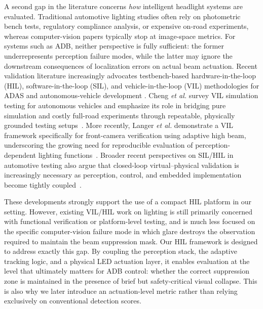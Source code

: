 \documentclass[pdflatex,sn-mathphys-num]{sn-jnl}%
\theoremstyle{thmstyleone}%
\theoremstyle{thmstyletwo}%
\theoremstyle{thmstylethree}%
\begin{document}

A second gap in the literature concerns \emph{how} intelligent headlight systems are evaluated. Traditional automotive lighting studies often rely
on photometric bench tests, regulatory compliance analysis, or expensive on-road experiments, whereas computer-vision papers typically stop at image-space metrics. For systems such as ADB, neither perspective is fully sufficient: the former underrepresents perception failure modes, while the latter may ignore the downstream consequences of localization errors on actual beam actuation.
Recent validation literature increasingly advocates testbench-based hardware-in-the-loop (HIL), software-in-the-loop (SIL), and vehicle-in-the-loop (VIL) methodologies for ADAS and autonomous-vehicle
development \cite{cheng2024survey, langer2026vehicle,balan2025perspective}. Cheng \emph{et al.} survey VIL simulation testing for autonomous vehicles and emphasize its role in bridging pure simulation and costly full-road experiments through repeatable, physically grounded
testing setups~\cite{cheng2024survey}. More recently, Langer \emph{et al.} demonstrate a VIL framework specifically for front-camera verification using adaptive high beam, underscoring the growing need for
reproducible evaluation of perception-dependent lighting functions~\cite{langer2026vehicle}. Broader recent perspectives on SIL/HIL in automotive testing also argue that closed-loop virtual--physical validation is increasingly necessary as perception, control, and embedded implementation become tightly coupled~\cite{balan2025perspective}.

These developments strongly support the use of a compact HIL platform in our setting. However, existing VIL/HIL work on lighting is still primarily concerned with functional verification or platform-level testing, and is much less focused on the specific computer-vision failure mode in which glare destroys the observation required to maintain the beam
suppression mask. Our HIL framework is designed to address exactly this gap. By coupling the perception stack, the adaptive tracking logic, and a physical LED actuation layer, it enables evaluation at the level that ultimately matters for ADB control: whether the correct suppression zone is maintained in the presence of brief but safety-critical visual collapse. This is also why we later introduce an actuation-level metric
rather than relying exclusively on conventional detection scores.
\end{document}
